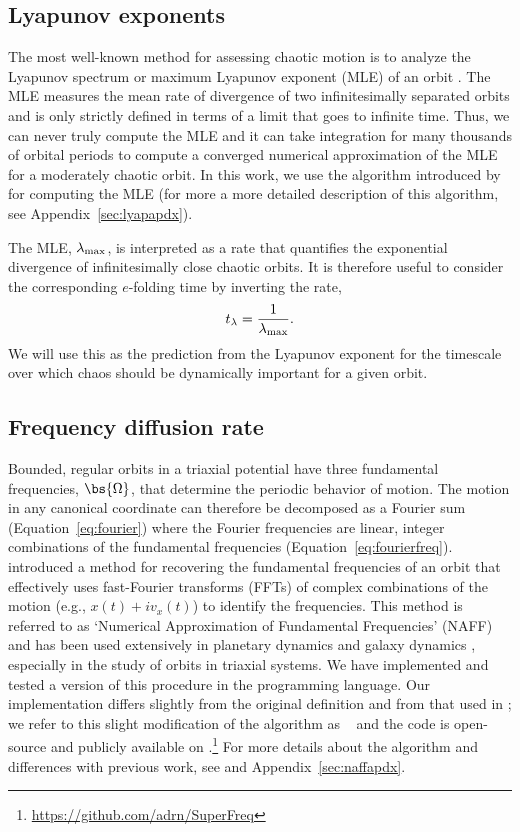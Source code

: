 \subsection{Lyapunov exponents} \label{sec:lyap}

The most well-known method for assessing chaotic motion is to analyze the
Lyapunov spectrum or maximum Lyapunov exponent (MLE) of an orbit
\citep{lyapunov92}. The MLE measures the mean rate of divergence of two
infinitesimally separated orbits and is only strictly defined in terms of a
limit that goes to infinite time. Thus, we can never truly compute the MLE and
it can take integration for many thousands of orbital periods to compute a
converged numerical approximation of the MLE for a moderately chaotic orbit. In
this work, we use the algorithm introduced by \cite{wolf85} for computing the
MLE (for more a more detailed description of this algorithm, see
Appendix~\ref{sec:lyapapdx}).

The MLE, $\lambda_{\rm max}$, is interpreted as a rate that quantifies the
exponential divergence of infinitesimally close chaotic orbits. It is therefore
useful to consider the corresponding $e$-folding time by inverting the rate,
\begin{equation}
	t_{\rm \lambda} = \frac{1}{\lambda_{\rm max}}.
\end{equation}
We will use this as the prediction from the Lyapunov exponent for the timescale
over which chaos should be dynamically important for a given orbit.

\subsection{Frequency diffusion rate}\label{sec:naff}

Bounded, regular orbits in a triaxial potential have three fundamental
frequencies, $\bs{\Omega}$, that determine the periodic behavior of motion. The
motion in any canonical coordinate can therefore be decomposed as a Fourier sum
(Equation~\ref{eq:fourier}) where the Fourier frequencies are linear, integer
combinations of the fundamental frequencies (Equation~\ref{eq:fourierfreq}).
\cite{laskar93} introduced a method for recovering the fundamental frequencies
of an orbit that effectively uses fast-Fourier transforms (FFTs) of complex
combinations of the motion (e.g., $x(t) + i v_x(t)$) to identify the
frequencies. This method is referred to as `Numerical Approximation of
Fundamental Frequencies' (NAFF) and has been used extensively in planetary
dynamics \citep[e.g.,][]{laskar93b, laskar96} and galaxy dynamics
\citep{papaphilippou98, valluri98}, especially in the study of orbits in
triaxial systems. We have implemented and tested a version of this procedure in
the  programming language. Our implementation differs slightly
from the original definition and from that used in \cite{valluri98}; we refer to
this slight modification of the algorithm as \superfreq\ \citep{superfreq} and
the code is open-source and publicly available on
.\footnote{\url{https://github.com/adrn/SuperFreq}} For more
details about the algorithm and differences with previous work, see
\cite{laskar88, laskar93, papaphilippou96} and Appendix~\ref{sec:naffapdx}.


